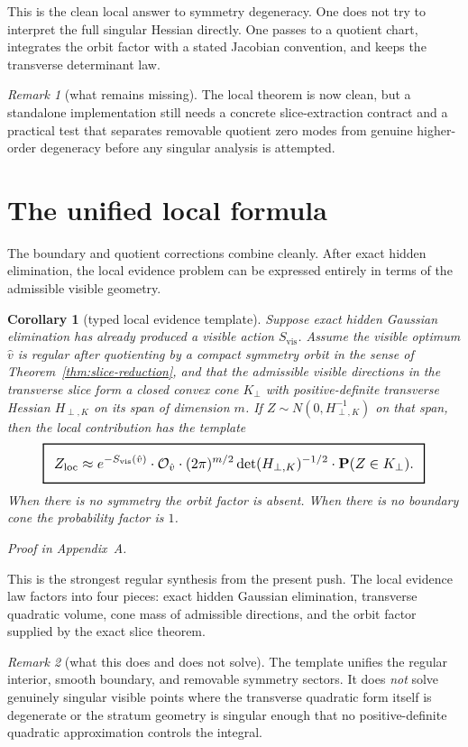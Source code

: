 \documentclass[11pt,a4paper]{article}
\numberwithin{equation}{section}
\newcommand{\Prob}{\mathbf P}
\newcommand{\geomboxed}[1]{%
  \setlength{\fboxsep}{8pt}%
  \setlength{\fboxrule}{0.9pt}%
  \fbox{\scalebox{1.12}{$\displaystyle #1$}}%
}
\theoremstyle{thmcompact}
\newtheorem{corollary}[theorem]{Corollary}
\theoremstyle{remark}
\newtheorem*{remarkplain}{Remark}
\newenvironment{remark}[1][]%
{\begin{remarkbox}\begin{remarkplain}[#1]\normalfont}
{\end{remarkplain}\end{remarkbox}}
\newcommand{\proofappendix}{\par{\hfill\scriptsize\emph{Proof in Appendix~A.}}\par}
\begin{document}
This is the clean local answer to symmetry degeneracy. One does not try to interpret the full singular Hessian directly. One passes to a quotient chart, integrates the orbit factor with a stated Jacobian convention, and keeps the transverse determinant law.

\begin{remark}[what remains missing]
The local theorem is now clean, but a standalone implementation still needs a concrete slice-extraction contract and a practical test that separates removable quotient zero modes from genuine higher-order degeneracy before any singular analysis is attempted.
\end{remark}

\section{The unified local formula}

The boundary and quotient corrections combine cleanly. After exact hidden elimination, the local evidence problem can be expressed entirely in terms of the admissible visible geometry.

\begin{corollary}[typed local evidence template]\label{cor:typed-local-template}
Suppose exact hidden Gaussian elimination has already produced a visible action $S_{\mathrm{vis}}$. Assume the visible optimum $\hat v$ is regular after quotienting by a compact symmetry orbit in the sense of Theorem~\ref{thm:slice-reduction}, and that the admissible visible directions in the transverse slice form a closed convex cone $K_{\perp}$ with positive-definite transverse Hessian $H_{\perp,K}$ on its span of dimension $m$. If $Z\sim N(0,H_{\perp,K}^{-1})$ on that span, then the local contribution has the template
\[
\geomboxed{
Z_{\mathrm{loc}}
\approx
e^{-S_{\mathrm{vis}}(\hat v)}
\cdot \mathcal O_{\hat v}
\cdot (2\pi)^{m/2}
\det(H_{\perp,K})^{-1/2}
\cdot \Prob(Z\in K_{\perp}).}
\]
When there is no symmetry the orbit factor is absent. When there is no boundary cone the probability factor is $1$.\proofappendix
\end{corollary}

This is the strongest regular synthesis from the present push. The local evidence law factors into four pieces: exact hidden Gaussian elimination, transverse quadratic volume, cone mass of admissible directions, and the orbit factor supplied by the exact slice theorem.

\begin{remark}[what this does and does not solve]
The template unifies the regular interior, smooth boundary, and removable symmetry sectors. It does \emph{not} solve genuinely singular visible points where the transverse quadratic form itself is degenerate or the stratum geometry is singular enough that no positive-definite quadratic approximation controls the integral.
\end{remark}
\end{document}
